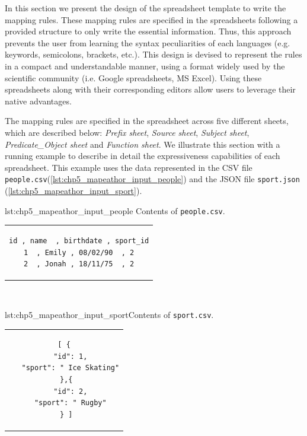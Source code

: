 
In this section we present the design of the spreadsheet template to write the mapping rules. 
These mapping rules are specified in the spreadsheets following a provided structure to only write the essential information. Thus, this approach prevents the user from learning the syntax peculiarities of each languages (e.g. keywords, semicolons, brackets, etc.).
This design is devised to represent the rules in a compact and understandable manner, using a format widely used by the scientific community (i.e. Google spreadsheets, MS Excel). 
Using these spreadsheets along with their corresponding editors allow users to leverage their native advantages.

The mapping rules are specified in the spreadsheet across five different sheets, which are described below: \textit{Prefix sheet}, \textit{Source sheet}, \textit{Subject sheet}, \textit{Predicate\_Object sheet} and \textit{Function sheet}. We illustrate this section with a running example to describe in detail the expressiveness capabilities of each spreadsheet. This example uses the data represented in the CSV file \texttt{people.csv}(\cref{lst:chp5_mapeathor_input_people}) and the JSON file \texttt{sport.json} (\cref{lst:chp5_mapeathor_input_sport}). 

\begin{minipage}{0.48\linewidth}
\begin{captionedlisting}{lst:chp5_mapeathor_input_people}{ Contents of \texttt{people.csv}.}
\centering
\begin{tabular}{c}
{
\begin{lstlisting}[basicstyle=\ttfamily\small,label={list:example1},columns=flexible]
id , name  , birthdate , sport_id
1  , Emily , 08/02/90  , 2
2  , Jonah , 18/11/75  , 2
\end{lstlisting}
}
\end{tabular}
\end{captionedlisting}
\end{minipage}
\,\,\,\,\hfill
\begin{minipage}{0.52\linewidth}
\begin{captionedlisting}{lst:chp5_mapeathor_input_sport}{Contents of \texttt{sport.csv}.}
\centering
\begin{tabular}{c}
\hspace{1.5em}
{
\begin{lstlisting}[basicstyle=\ttfamily\small,label={list:example1},columns=flexible]
[ {
   "id": 1,
   "sport": " Ice Skating"
 },{
   "id": 2,
   "sport": " Rugby"
 } ]
\end{lstlisting}
}
\end{tabular}
\end{captionedlisting}
\end{minipage}



